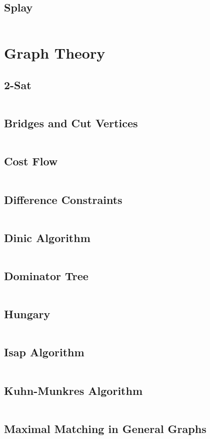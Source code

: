 \documentclass[a4paper,openany]{book}
\newcommand{\cppcode}[1]
{
  \inputminted[mathescape,
  tabsize=4,
  linenos,
  framesep=2mm,
  breakaftergroup=true,
  breakautoindent=true,
  breakbytoken=true,
  breaklines=true,
  fontsize=\small
  ]{cpp}{source/#1}
}
\begin{document}
\section{Splay}
\cppcode{/Data Structure/Splay.cpp}

\chapter{Graph Theory}
\section{2-Sat}
\cppcode{/Graph Theory/2-Sat.cpp}
\section{Bridges and Cut Vertices}
\cppcode{/Graph Theory/Bridges and Cut Vertices.cpp}
\section{Cost Flow}
\cppcode{/Graph Theory/Cost Flow.cpp}
\section{Difference Constraints}
\cppcode{/Graph Theory/Difference Constraints.cpp}
\section{Dinic Algorithm}
\cppcode{/Graph Theory/Dinic Algorithm.cpp}
\section{Dominator Tree}
\cppcode{/Graph Theory/Dominator Tree.cpp}
\section{Hungary}
\cppcode{/Graph Theory/Hungary.cpp}
\section{Isap Algorithm}
\cppcode{/Graph Theory/Isap Algorithm.cpp}
\section{Kuhn-Munkres Algorithm}
\cppcode{/Graph Theory/Kuhn-Munkres Algorithm.cpp}
\section{Maximal Matching in General Graphs}
\cppcode{/Graph Theory/Maximal Matching in General Graphs.cpp}
\end{document}
